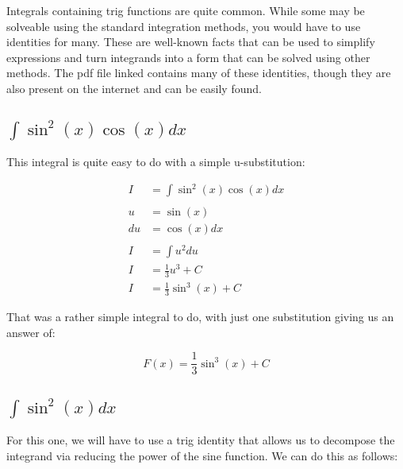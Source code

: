 \documentclass[12pt]{article}
\begin{document}
Integrals containing trig functions are quite common.
While some may be solveable using the standard integration methods, you would have to use identities for many.
These are well-known facts that can be used to simplify expressions and turn integrands into a form that can be solved using other methods.
The pdf file linked contains many of these identities, though they are also present on the internet and can be easily found.

\subsection{$\int \sin^2(x)\cos(x) dx$}

This integral is quite easy to do with a simple u-substitution:


\begin{align}
    I  & = \int \sin^2(x)\cos(x) dx \\
    \nonumber                       \\
    u  & = \sin(x)                  \\
    du & = \cos(x) dx               \\
    \nonumber                       \\
    I  & = \int u^2 du              \\
    I  & = \frac{1}{3}u^3 + C       \\
    I  & = \frac{1}{3}\sin^3(x) + C
\end{align}


That was a rather simple integral to do, with just one substitution giving us an answer of:

$$
    F(x) = \frac{1}{3}\sin^3(x) + C
$$

\subsection{$\int \sin^2(x) dx$}

For this one, we will have to use a trig identity that allows us to decompose the integrand via reducing the power of the sine function.
We can do this as follows:
\end{document}
